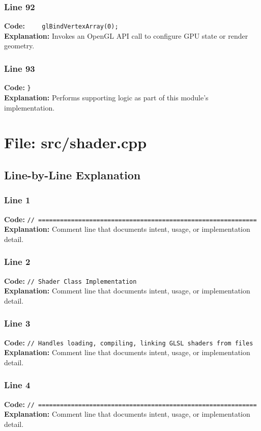 \documentclass[11pt,a4paper]{article}
\begin{document}
\subsubsection*{Line 92}
\textbf{Code:} \verb|    glBindVertexArray(0);|\\
\textbf{Explanation:} Invokes an OpenGL API call to configure GPU state or render geometry.

\subsubsection*{Line 93}
\textbf{Code:} \verb|}|\\
\textbf{Explanation:} Performs supporting logic as part of this module's implementation.

\newpage
\section{File: src/shader.cpp}
\subsection{Line-by-Line Explanation}
\subsubsection*{Line 1}
\textbf{Code:} \verb|// ============================================================|\\
\textbf{Explanation:} Comment line that documents intent, usage, or implementation detail.

\subsubsection*{Line 2}
\textbf{Code:} \verb|// Shader Class Implementation|\\
\textbf{Explanation:} Comment line that documents intent, usage, or implementation detail.

\subsubsection*{Line 3}
\textbf{Code:} \verb|// Handles loading, compiling, linking GLSL shaders from files|\\
\textbf{Explanation:} Comment line that documents intent, usage, or implementation detail.

\subsubsection*{Line 4}
\textbf{Code:} \verb|// ============================================================|\\
\textbf{Explanation:} Comment line that documents intent, usage, or implementation detail.
\end{document}
